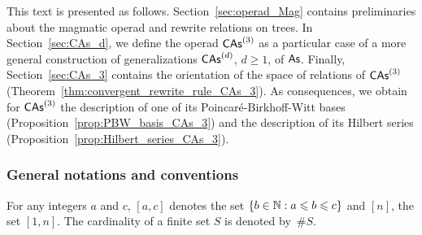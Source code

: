This text is presented as follows. Section~\ref{sec:operad_Mag} contains
preliminaries about the magmatic operad and rewrite relations on trees.
In Section~\ref{sec:CAs_d}, we define the operad $\mathsf{CAs}^{\left(3\right)}$ as a
particular case of a more general construction of generalizations
$\mathsf{CAs}^{\left(d\right)}$, $d \geq 1$, of $\mathsf{As}$. Finally, Section~\ref{sec:CAs_3}
contains the orientation of the space of relations of
$\mathsf{CAs}^{\left(3\right)}$ (Theorem~\ref{thm:convergent_rewrite_rule_CAs_3}). As
consequences, we obtain for $\mathsf{CAs}^{\left(3\right)}$
the description of one of its Poincaré-Birkhoff-Witt bases
(Proposition~\ref{prop:PBW_basis_CAs_3}) and the description of
its Hilbert series (Proposition~\ref{prop:Hilbert_series_CAs_3}).
\medbreak

\subsubsection*{General notations and conventions}
For any integers $a$ and $c$, $[a, c]$ denotes the set
$\{b \in \mathbb{N} : a \leqslant b \leqslant c\}$ and $[n]$, the set $[1, n]$. The
cardinality of a finite set $S$ is denoted by~$\# S$.
\medbreak
